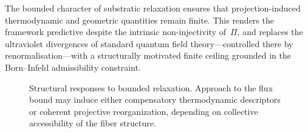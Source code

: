     The bounded character of substratic relaxation ensures that projection-induced
    thermodynamic and geometric quantities remain finite.
    This renders the framework predictive despite the intrinsic non-injectivity of~$\Pi$,
    and replaces the ultraviolet divergences of standard quantum field theory---controlled
    there by renormalisation---with a structurally motivated finite ceiling grounded in
    the Born--Infeld admissibility constraint.

    \begin{figure}[t]
      \centering
      \caption{Structural responses to bounded relaxation.
      Approach to the flux bound may induce either compensatory
      thermodynamic descriptors or coherent projective reorganization,
        depending on collective accessibility of the fiber structure.}
      \label{fig:projective-hourglass}
    \end{figure}
